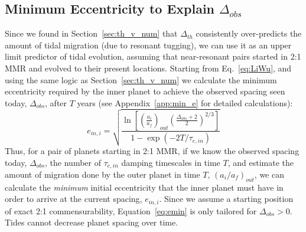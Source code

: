 \subsection{Minimum Eccentricity to Explain $\Delta_{obs}$}
\label{sec:mine}
Since we found in Section~\ref{sec:th_v_num} that $\Delta_{th}$ consistently over-predicts the amount of tidal migration (due to resonant tugging), we can use it as an upper limit predictor of tidal evolution, assuming that near-resonant pairs started in 2:1 MMR and evolved to their present locations. 
Starting from Eq.~\ref{eq:LiWu}, and using the same logic as Section~\ref{sec:th_v_num} we calculate the minimum eccentricity required by the inner planet to achieve the observed spacing seen today, $\Delta_{obs}$, after $T$ years (see Appendix~\ref{app:min_e} for detailed calculations):
\begin{equation}
e_{in,i} = \sqrt{\frac{\ln[(\frac{a_i}{a_f})_{out} (\frac{\Delta_{obs} + 2}{2})^{2/3}]}{1 - \exp(-2T/\tau_{e,in})}}
\label{eq:emin}
\end{equation}
Thus, for a pair of planets starting in 2:1 MMR, if we know the observed spacing today, $\Delta_{obs}$, the number of $\tau_{e,in}$ damping timescales in time $T$, and estimate the amount of migration done by the outer planet in time $T$, $(a_i /a_f)_{out}$, we can calculate the {\it minimum} initial eccentricity that the inner planet must have in order to arrive at the current spacing, $e_{in,i}$. 
Since we assume a starting position of exact 2:1 commensurability, Equation~\ref{eq:emin} is only tailored for $\Delta_{obs} > 0$. Tides cannot decrease planet spacing over time.

